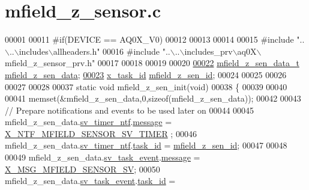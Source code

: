 \hypertarget{a00053_source}{\section{mfield\+\_\+z\+\_\+sensor.\+c}
\label{a00053_source}
}

\begin{DoxyCode}
00001 
00011 \textcolor{preprocessor}{#if(DEVICE == AQ0X\_V0)}
00012 
00013 
00014 
00015 \textcolor{preprocessor}{#include "..\(\backslash\)..\(\backslash\)includes\(\backslash\)allheaders.h"}
00016 \textcolor{preprocessor}{#include "..\(\backslash\)..\(\backslash\)includes\_prv\(\backslash\)aq0X\(\backslash\)mfield\_z\_sensor\_prv.h"}
00017 
00018 
00019 
00020 
\hypertarget{a00053_source_l00022}{}\hyperlink{a00053_ae42bea09c571df9fad890518725d5cf4}{00022} \hyperlink{a00027_d8/dbd/a00597}{mfield\_z\_sen\_data\_t} \hyperlink{a00053_ae42bea09c571df9fad890518725d5cf4}{mfield\_z\_sen\_data};
\hypertarget{a00053_source_l00023}{}\hyperlink{a00053_a8b08b70b0141a3a5c4b0f6097b49d437}{00023} \hyperlink{a00036_ad5c3c5fbfd3e4aadf22830395484a71d}{x\_task\_id}           \hyperlink{a00053_a8b08b70b0141a3a5c4b0f6097b49d437}{mfield\_z\_sen\_id};
00024 
00025 
00026 
00027 
00028 
00037 \textcolor{keyword}{static} \textcolor{keywordtype}{void} mfield\_z\_sen\_init(\textcolor{keywordtype}{void})
00038 \{
00039 
00040 
00041     memset(&mfield\_z\_sen\_data,0,\textcolor{keyword}{sizeof}(mfield\_z\_sen\_data));
00042 
00043     \textcolor{comment}{// Prepare notifications and events to be used later on}
00044 
00045     mfield\_z\_sen\_data.\hyperlink{a00027_ada91b200053f2d93e3639dc4ee3415b4}{sv\_timer\_ntf}.\hyperlink{a00036_adf9665938515a20c283eea2c978cf80d}{message}                               = 
      \hyperlink{a00025_ad9eede821e7c65d58f1806af4bd6bf29}{X\_NTF\_MFIELD\_SENSOR\_SV\_TIMER} ;
00046     mfield\_z\_sen\_data.\hyperlink{a00027_ada91b200053f2d93e3639dc4ee3415b4}{sv\_timer\_ntf}.\hyperlink{a00036_a21b41e494a28583d4da10f1afb1c5328}{task\_id}                        = 
      \hyperlink{a00053_a8b08b70b0141a3a5c4b0f6097b49d437}{mfield\_z\_sen\_id};
00047 
00048 
00049     mfield\_z\_sen\_data.\hyperlink{a00027_a43c345f39ea3aefbb60ef1ef57fe5d83}{sv\_task\_event}.\hyperlink{a00036_adf9665938515a20c283eea2c978cf80d}{message}                  = 
      \hyperlink{a00025_a510020575747f82c587c5485b8619f78}{X\_MSG\_MFIELD\_SENSOR\_SV};
00050     mfield\_z\_sen\_data.\hyperlink{a00027_a43c345f39ea3aefbb60ef1ef57fe5d83}{sv\_task\_event}.\hyperlink{a00036_a21b41e494a28583d4da10f1afb1c5328}{task\_id}              = 

\end{DoxyCode}
